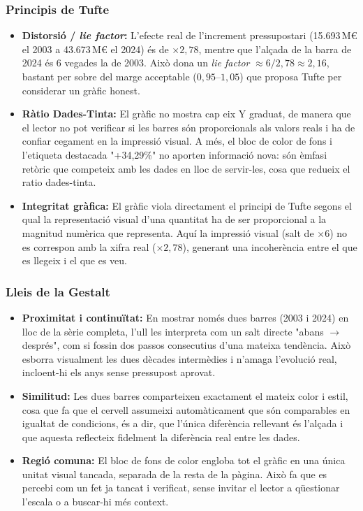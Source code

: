 \documentclass[11pt,a4paper]{article}
\begin{document}
\subsubsection{Principis de Tufte}
\begin{itemize}
  \item \textbf{Distorsió / \textit{lie factor}:} L'efecte real de l'increment pressupostari
  (15.693\,M€ el 2003 a 43.673\,M€ el 2024) és de $\times 2{,}78$, mentre que l'alçada
  de la barra de 2024 és 6 vegades la de 2003. Això dona un \emph{lie factor}
  $\approx 6/2{,}78 \approx 2{,}16$, bastant per sobre del marge acceptable ($0{,}95$--$1{,}05$)
  que proposa Tufte per considerar un gràfic honest.
  \item \textbf{Ràtio Dades-Tinta:} El gràfic no mostra cap eix Y graduat, de manera que el
  lector no pot verificar si les barres són proporcionals als valors reals i ha de confiar
  cegament en la impressió visual. A més, el bloc de color de fons i l'etiqueta destacada
  "+34,29\%" no aporten informació nova: són èmfasi retòric que competeix amb les dades
  en lloc de servir-les, cosa que redueix el ratio dades-tinta.
  \item \textbf{Integritat gràfica:} El gràfic viola directament el principi de Tufte segons
  el qual la representació visual d'una quantitat ha de ser proporcional a la magnitud
  numèrica que representa. Aquí la impressió visual (salt de $\times 6$) no es correspon
  amb la xifra real ($\times 2{,}78$), generant una incoherència entre el que es llegeix
  i el que es veu.
\end{itemize}

\subsubsection{Lleis de la Gestalt}
\begin{itemize}
  \item \textbf{Proximitat i continuïtat:} En mostrar només dues barres (2003 i 2024) en
  lloc de la sèrie completa, l'ull les interpreta com un salt directe "abans $\rightarrow$
  després", com si fossin dos passos consecutius d'una mateixa tendència. Això esborra
  visualment les dues dècades intermèdies i n'amaga l'evolució real, incloent-hi els anys
  sense pressupost aprovat.
  \item \textbf{Similitud:} Les dues barres comparteixen exactament el mateix color i estil,
  cosa que fa que el cervell assumeixi automàticament que són comparables en igualtat de
  condicions, és a dir, que l'única diferència rellevant és l'alçada i que aquesta reflecteix
  fidelment la diferència real entre les dades.
  \item \textbf{Regió comuna:} El bloc de fons de color engloba tot el gràfic
  en una única unitat visual tancada, separada de la resta de la pàgina. Això fa que es
  percebi com un fet ja tancat i verificat, sense invitar el lector a qüestionar l'escala
  o a buscar-hi més context.
\end{itemize}
\end{document}

